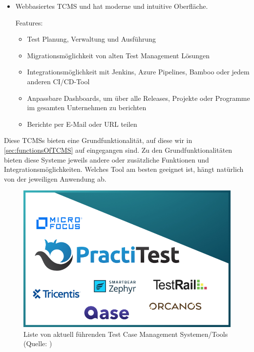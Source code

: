 \documentclass[a4paper, fontsize=11pt, parskip=half, twoside]{scrreprt}
\begin{document}
\begin{itemize}
		\item \textcite{noauthor_tricentis_nodate-1} 
		
		Webbasiertes \acl{TCMS} und hat moderne und intuitive Oberfläche.
		
		Features:
		\begin{itemize}
			\setlength\itemsep{-0.5em}
			\item Test Planung, Verwaltung und Ausführung 
			\item Migrationsmöglichkeit von alten Test Management Lösungen
			\item Integrationsmöglichkeit mit Jenkins, Azure Pipelines, Bamboo oder jedem anderen CI/CD-Tool
			\item Anpassbare Dashboards, um über alle Releases, Projekte oder Programme im gesamten Unternehmen zu berichten
			\item Berichte per E-Mail oder URL teilen
		\end{itemize}
	\end{itemize}
	
	Diese \aclp{TCMS} bieten eine Grundfunktionalität, auf diese wir in \autoref{sec:functionsOfTCMS} auf  eingegangen sind. 
	Zu den Grundfunktionalitäten bieten diese Systeme jeweils andere oder zusätzliche Funktionen und Integrationsmöglichkeiten.
	Welches Tool am besten geeignet ist, hängt natürlich von der jeweiligen Anwendung ab.
	\newline
	\begin{figure}[H]
		\centering
		\includegraphics[scale=0.5]{assets/best-tool-logos.jpg}
		\caption{Liste von aktuell führenden Test Case Management Systemen/Tools (Quelle: \textcite{noauthor_7_nodate})}
		\label{fig:tcms_logo}
	\end{figure}
	
\end{document}
